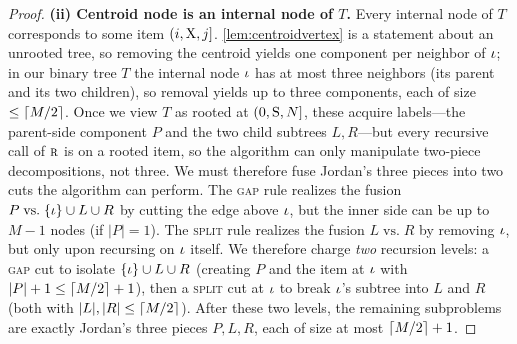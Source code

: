 \documentclass{article}
\begin{document}
\begin{proof}
    \textbf{(ii) Centroid node is an internal node of $T$.}
    Every internal node of $T$ corresponds to some item $({{ i}}, {{ \mathrm{X}}}, {{ j}}]$.
    \cref{lem:centroidvertex} is a statement about an unrooted tree, so removing the centroid yields one component per neighbor of ${{ \iota}}$; in our binary tree $T$ the internal node ${{ \iota}}$ has at most three neighbors (its parent and its two children), so removal yields up to three components, each of size $\le \lceil M/2\rceil$.
    Once we view $T$ as rooted at $(0, {{ \mathrm{S}}}, {{ N}}]$, these acquire labels---the parent-side component $P$ and the two child subtrees $L, R$---but every recursive call of ${\textsc{r}}$ is on a rooted item, so the algorithm can only manipulate two-piece decompositions, not three. 
    We must therefore fuse Jordan's three pieces into two cuts the algorithm can perform. The \textsc{gap} rule realizes the fusion $P \;\mathrm{vs.}\; \{{{ \iota}}\} \cup L \cup R$ by cutting the edge above ${{ \iota}}$, but the inner side can be up to $M - 1$ nodes (if $|P| = 1$). 
    The \textsc{split} rule realizes the fusion $L \;\mathrm{vs.}\; R$ by removing ${{ \iota}}$, but only upon recursing on ${{ \iota}}$ itself. 
    We therefore charge \emph{two} recursion levels: a \textsc{gap} cut to isolate $\{{{ \iota}}\} \cup L \cup R$ (creating $P$ and the item at ${{ \iota}}$ with $|P| + 1 \le \lceil M/2\rceil + 1$), then a \textsc{split} cut at ${{ \iota}}$ to break ${{ \iota}}$'s subtree into $L$ and $R$ (both with $|L|, |R| \le \lceil M/2\rceil$). 
    After these two levels, the remaining subproblems are exactly Jordan's three pieces $P, L, R$, each of size at most $\lceil M/2\rceil + 1$.
    

\end{proof}
\end{document}
